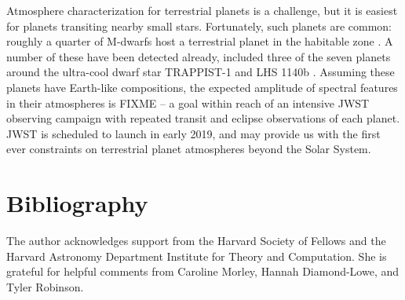 \documentclass[graybox,natbib,nosecnum]{svmult}
\begin{document}
Atmosphere characterization for terrestrial planets is a challenge, but it is easiest for planets transiting nearby small stars.  Fortunately, such planets are common: roughly a quarter of M-dwarfs host a terrestrial planet in the habitable zone \citep{dressing15}. A number of these have been detected already, included three of the seven planets around the ultra-cool dwarf star TRAPPIST-1 and LHS 1140b \citep{gillon17, dittmann17}. Assuming these planets have Earth-like compositions, the expected amplitude of spectral features in their atmospheres is FIXME -- a goal within reach of an intensive JWST observing campaign with repeated transit and eclipse observations of each planet.  JWST is scheduled to launch in early 2019, and may provide us with the first ever constraints on terrestrial planet atmospheres beyond the Solar System. 

\section{Bibliography}

\begin{acknowledgement}
The author acknowledges support from the Harvard Society of Fellows and the Harvard Astronomy Department Institute for Theory and Computation. She is grateful for helpful comments from Caroline Morley, Hannah Diamond-Lowe, and Tyler Robinson.
\end{acknowledgement}

\end{document}
